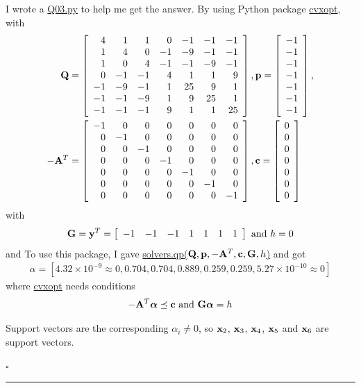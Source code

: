 \documentclass[12pt]{article}
\newcommand*{\QEDB}{\hfill\ensuremath{\square}}
\newcommand{\SBrackets}[1]{\left[#1\right]}
\newcommand{\BF}[1]{{\bf#1}}
\newcommand{\SciNum}[2]{#1\times{10}^{#2}}
\newcommand{\Matrix}[2]{\SBrackets{\begin{array}{#1}#2\end{array}}}
\newcommand{\horrule}[1]{\rule{\linewidth}{#1}}
\begin{document}
I wrote a \url{Q03.py} to help me get the answer. By using Python package \url{cvxopt}, with
\begin{align}
\BF{Q}&=\Matrix{rrrrrrr}{4&1&1&0&-1&-1&-1\\1&4&0&-1&-9&-1&-1\\1&0&4&-1&-1&-9&-1\\0&-1&-1&4&1&1&9\\-1&-9&-1&1&25&9&1\\-1&-1&-9&1&9&25&1\\-1&-1&-1&9&1&1&25},\BF{p}=\Matrix{r}{-1\\-1\\-1\\-1\\-1\\-1\\-1},\\
-\BF{A}^T&=\Matrix{rrrrrrr}{-1&0&0&0&0&0&0\\0&-1&0&0&0&0&0\\0&0&-1&0&0&0&0\\0&0&0&-1&0&0&0\\0&0&0&0&-1&0&0\\0&0&0&0&0&-1&0\\0&0&0&0&0&0&-1},\BF{c}=\Matrix{c}{0\\0\\0\\0\\0\\0\\0}
\end{align}
with
\begin{align}
\BF{G}=\BF{y}^T=\Matrix{ccccccc}{-1&-1&-1&1&1&1&1}\text{ and }h=0
\end{align}
and
To use this package, I gave \url{solvers.qp(}$\BF{Q}, \BF{p}, -\BF{A}^T, \BF{c},\BF{G},h$\url{)} and got
\begin{align}
\alpha=\SBrackets{\SciNum{4.32}{-9}\approx0,0.704,0.704,0.889,0.259,0.259,\SciNum{5.27}{-10}\approx0}
\end{align}
where \url{cvxopt} needs conditions
\begin{align}
-\BF{A}^T{\bm\alpha}\preceq\BF{c}\text{ and }\BF{G}\bm{\alpha}=h
\end{align}

Support vectors are the corresponding $\alpha_i\neq0$, so $\BF{x}_2$, $\BF{x}_3$, $\BF{x}_4$, $\BF{x}_5$ and $\BF{x}_6$ are support vectors.

\QEDB

\horrule{0.5pt}
\end{document}
